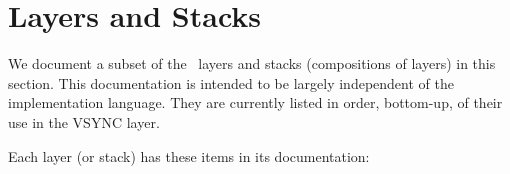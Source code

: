 \newenvironment{Notes}{%
\paragraph{Notes} ~\par\begin{itemize}
}{\end{itemize}}

\newenvironment{Testing}{%
\paragraph{Testing} ~\par\begin{itemize}
}{\end{itemize}}

\section{Layers and Stacks}

We document a subset of the \ensemble\ layers and stacks (compositions of
layers) in this section.  This documentation is intended to be largely
independent of the implementation language.  They are currently listed in
order, bottom-up, of their use in the VSYNC layer.

Each layer (or stack) has these items in its documentation:

